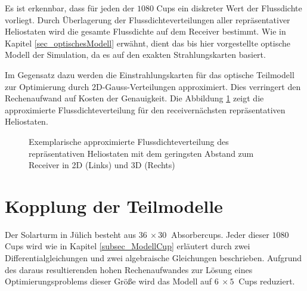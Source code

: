 Es ist erkennbar, dass für jeden der $1080$ Cups ein diskreter Wert der Flussdichte vorliegt.
Durch Überlagerung der Flussdichteverteilungen aller repräsentativer Heliostaten wird die gesamte Flussdichte auf dem Receiver bestimmt.
Wie in Kapitel \ref{sec_optischesModell} erwähnt, dient das bis hier vorgestellte optische Modell der Simulation, da es auf den exakten Strahlungskarten basiert.

Im Gegensatz dazu werden die Einstrahlungskarten für das optische Teilmodell zur Optimierung durch 2D-Gauss-Verteilungen approximiert.
Dies verringert den Rechenaufwand auf Kosten der Genauigkeit.
Die Abbildung \ref{fig_GaussFluxmap} zeigt die approximierte Flussdichteverteilung für den receivernächsten repräsentativen Heliostaten.

\begin{figure}[h!]
    \centering
    \setlength{\fboxsep}{1pt}
    \setlength{\fboxrule}{1pt}
    \caption[Exemplarische approximierte Flussdichteverteilung des repräsentativen Heliostaten mit dem geringsten Abstand zum Receiver in 2D und 3D]{Exemplarische approximierte Flussdichteverteilung des repräsentativen Heliostaten mit dem geringsten Abstand zum Receiver in 2D (Links) und 3D (Rechts)}
    \label{fig_GaussFluxmap}
\end{figure}


\section{Kopplung der Teilmodelle} \label{sec_KopplungModelle}
Der Solarturm in Jülich besteht aus $\SI{36}{} \times \SI{30}{}$ Absorbercups.
Jeder dieser $1080$ Cups wird wie in Kapitel \ref{subsec_ModellCup} erläutert durch zwei Differentialgleichungen und zwei algebraische Gleichungen beschrieben.
Aufgrund des daraus resultierenden hohen Rechenaufwandes zur Lösung eines Optimierungsproblems dieser Größe wird das Modell auf $\SI{6}{} \times \SI{5}{}$ Cups reduziert.


